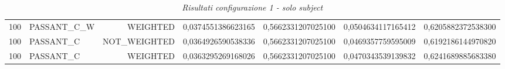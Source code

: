 \begin{table}[H]
{\begin{tabular}{ c l r c c c c }
				100 & PASSANT\_C\_W &   WEIGHTED & 0,0374551386623165 & 0,5662331207025100 & 0,0504634117165412 & 0,6205882372538300 \\
				
				100 &  PASSANT\_C & NOT\_WEIGHTED & 0,0364926590538336 & 0,5662331207025100 & 0,0469357759595009 & 0,6192186144970820 \\
				
				100 &  PASSANT\_C &   WEIGHTED & 0,0363295269168026 & 0,5662331207025100 & 0,0470343539139832 & 0,6241689885683380 \\  			
			\bottomrule
		\end{tabular}  
}
\caption{\emph{Risultati configurazione 1 - solo subject}}
\end{table}

\setlength{\tabcolsep}{12pt}
